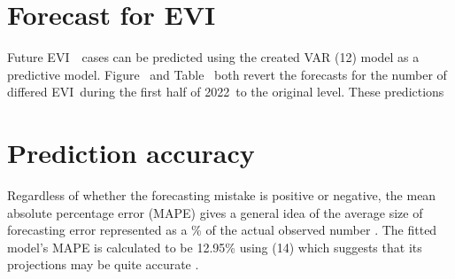\section{Forecast for EVI} Future EVI  cases can be predicted using the created VAR (12) model as a predictive model. Figure  and Table  both revert the forecasts for the number of differed EVI during the first half of 2022 to the original level. These predictions

\section{Prediction accuracy} Regardless of whether the forecasting mistake is positive or negative, the mean absolute percentage error (MAPE) gives a general idea of the average size of forecasting error represented as a \% of the actual observed number . The fitted model's MAPE is calculated to be 12.95\% using (14) which suggests that its projections may be quite accurate .